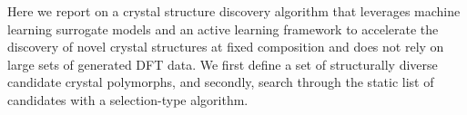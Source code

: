 %
%
Here we report on a crystal structure discovery algorithm that leverages machine learning surrogate models and an active learning framework to accelerate the discovery of novel crystal structures at fixed composition and does not rely on large sets of generated DFT data.
%
%
We first define a set of structurally diverse candidate crystal polymorphs, and secondly, search through the static list of candidates with a selection-type algorithm.
%
%
%
%

